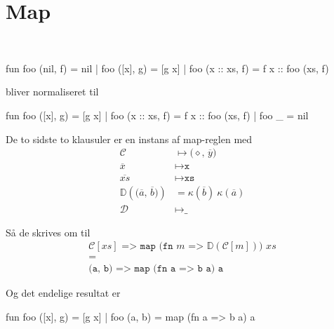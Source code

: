 \section{Map}

\begin{example}\
\begin{sml}
fun foo (nil, f)     = nil
  | foo ([x], g)     = [g x]
  | foo (x :: xs, f) = f x :: foo (xs, f)
\end{sml}

bliver normaliseret til

\begin{sml}
fun foo ([x], g)     = [g x]
  | foo (x :: xs, f) = f x :: foo (xs, f)
  | foo _            = nil
\end{sml}

De to sidste to klausuler er en instans af \textsf{map}-reglen med
\begin{eqnarray*}[rl]
\mathcal{C} &\mapsto \texttt{($\diamond$, $\overline{y}$)}\\
\overline{x} &\mapsto \texttt{x}\\
\overline{xs} &\mapsto \texttt{xs}\\
\mathbb{D}(\texttt{($\overline{a}$, $\overline{b}$)}) &= \kappa(\overline{b})\
\kappa(\overline{a})\\
\mathcal{D} &\mapsto \texttt{\_}
\end{eqnarray*}

Så de skrives om til
  \begin{eqnarray*}[c]
    \texttt{$\mathcal{C}[xs]$ => map (fn $m$ =>
      $\mathbb{D}(\mathcal{C}[m])$) $xs$}\\
    =\\
    \texttt{(a, b) => map (fn a => b a) a}
  \end{eqnarray*}
  
Og det endelige resultat er

\begin{sml}
fun foo ([x], g) = [g x]
  | foo (a, b)   = map (fn a => b a) a
\end{sml}

\end{example}

